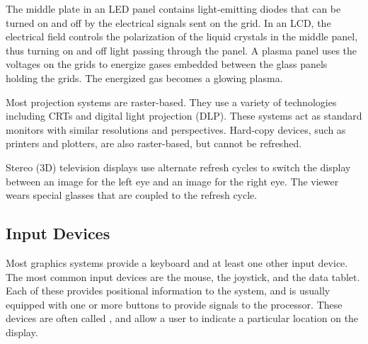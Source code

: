 \documentclass[../COS3712_Notes.tex]{subfiles}
\begin{document}
        The middle plate in an LED panel contains light-emitting diodes
        that can be turned on and off by the electrical signals sent on the grid.
        In an LCD, the electrical field controls the polarization of the liquid crystals in
        the middle panel,
        thus turning on and off light passing through the panel.
        A plasma panel uses the voltages on the grids to energize gases embedded between the
        glass panels holding the grids.
        The energized gas becomes a glowing plasma.

        Most projection systems are raster-based.
        They use a variety of technologies including CRTs and digital light projection (DLP).
        These systems act as standard monitors with similar resolutions and perspectives.
        Hard-copy devices, such as printers and plotters, are also raster-based, but cannot be
        refreshed.

        Stereo (3D) television displays use alternate refresh cycles to switch the display
        between an image for the left eye and an image for the right eye.
        The viewer wears special glasses that are coupled to the refresh cycle.

      \subsection{Input Devices}
        Most graphics systems provide a keyboard and at least one other input device.
        The most common input devices are the mouse, the joystick, and the data tablet.
        Each of these provides positional information to the system,
        and is usually equipped with one or more buttons to provide signals to the processor.
        These devices are often called ,
        and allow a user to indicate a particular location on the display.
\end{document}
